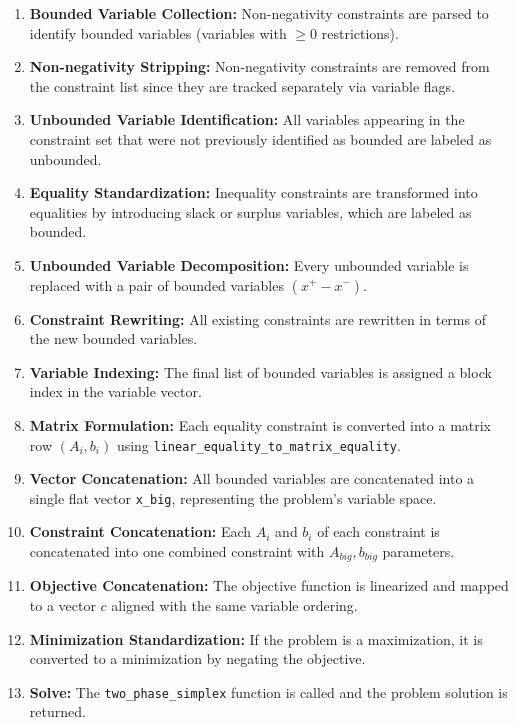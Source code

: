 \documentclass[conference]{IEEEtran}
\begin{document}
\begin{enumerate}
    \item \textbf{Bounded Variable Collection:} Non-negativity constraints are parsed to identify bounded variables (variables with $\geq 0$ restrictions).
    
    \item \textbf{Non-negativity Stripping:} Non-negativity constraints are removed from the constraint list since they are tracked separately via variable flags.
        
    \item \textbf{Unbounded Variable Identification:} All variables appearing in the constraint set that were not previously identified as bounded are labeled as unbounded.
    
    \item \textbf{Equality Standardization:} Inequality constraints are transformed into equalities by introducing slack or surplus variables, which are labeled as bounded.
    
    \item \textbf{Unbounded Variable Decomposition:} Every unbounded variable is replaced with a pair of bounded variables $(x^+ - x^-)$.
    
    \item \textbf{Constraint Rewriting:} All existing constraints are rewritten in terms of the new bounded variables.
    
    \item \textbf{Variable Indexing:} The final list of bounded variables is assigned a block index in the variable vector.
    
    \item \textbf{Matrix Formulation:} Each equality constraint is converted into a matrix row $(A_i, b_i)$ using \texttt{linear\_equality\_to\_matrix\_equality}.

    \item \textbf{Vector Concatenation:} All bounded variables are concatenated into a single flat vector \texttt{x\_big}, representing the problem’s variable space.

    \item \textbf{Constraint Concatenation:} Each $A_i$ and $b_i$ of each constraint is concatenated into one combined constraint with $A_{big}, b_{big}$ parameters.
    
    \item \textbf{Objective Concatenation:} The objective function is linearized and mapped to a vector $c$ aligned with the same variable ordering.
    
    \item \textbf{Minimization Standardization:} If the problem is a maximization, it is converted to a minimization by negating the objective.
    \item \textbf{Solve: } The \texttt{two\_phase\_simplex} function is called and the problem solution is returned.
\end{enumerate}
\end{document}
